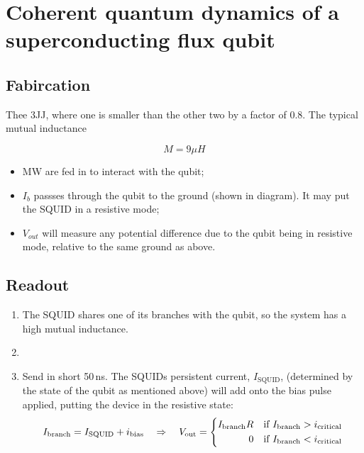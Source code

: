 \section{Coherent     quantum     dynamics     of     a     superconducting     flux     qubit
  \cite{chiorescu2003}\cite{chiorescu2004}}
 
 \subsection{Fabircation}
 Thee 3JJ,  where one is smaller  than the other  two by a  factor of 0.8. The  typical mutual
 inductance
 
 \[ 
   M = 9\mu H
 \]
  
  
 \begin{itemize}
 \item MW are fed in to interact with the qubit;
 \item $  I_b $ passses through  the qubit to  the ground (shown  in diagram). It may  put the
   SQUID in a resistive mode;
 \item $ V_{out} $  will measure any potential difference due to the  qubit being in resistive
   mode, relative to the same ground as above.
 \end{itemize}

 \subsection{Readout}
 \begin{enumerate}
 \item The SQUID  shares one of its branches with  the qubit, so the system has  a high mutual
   inductance.
 \item  {}
 \item Send in short 50\,ns. The SQUIDs persistent current, $ I_\text{SQUID} $, (determined by
   the state of  the qubit as mentioned above)  will add onto the bias  pulse applied, putting
   the device in the resistive state:
   \[
     I_\text{branch} = I_\text{SQUID} + i_\text{bias} \quad\Rightarrow\quad V_\text{out} = \left\lbrace\begin{aligned}I_\text{branch}R &&\text{if $ I_\text{branch} > i_\text{critical} $}\\
       0 &&\text{if $ I_\text{branch} < i_\text{critical} $}\end{aligned}\right. \]
 \end{enumerate}

